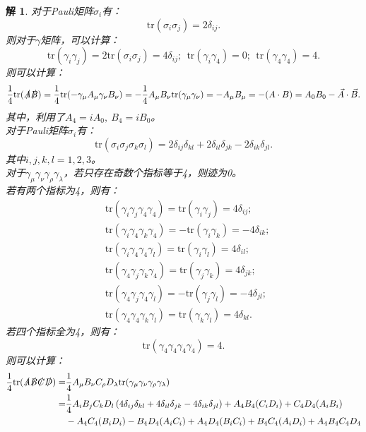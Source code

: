\documentclass[UTF8,10pt,a4paper]{article}
\theoremstyle{Problem}%
\theoremstyle{Solution}%
\newtheorem*{sol}{解}%
\begin{document}
\begin{sol}
对于Pauli矩阵$\sigma_i$有：
\[
    \text{tr}(\sigma_i\sigma_j) = 2\delta_{ij}.
\]
则对于$\gamma$矩阵，可以计算：
\[
    \text{tr}(\gamma_i\gamma_j) = 2\text{tr}(\sigma_i\sigma_j) = 4\delta_{ij}; ~~ \text{tr}(\gamma_i\gamma_4) = 0; ~~ \text{tr}(\gamma_4\gamma_4) = 4.
\]
则可以计算：
\[
    \frac{1}{4}\text{tr}(\slashed{A}\slashed{B}) = \frac{1}{4}\text{tr}(-\gamma_\mu A_\mu \gamma_\nu B_\nu) = -\frac{1}{4} A_\mu B_\nu \text{tr}(\gamma_\mu\gamma_\nu) = -A_\mu B_\mu = -(A\cdot B) = A_0 B_0 - \vec{A} \cdot \vec{B}.
\]
其中，利用了$A_4 = iA_0, ~ B_4 = iB_0$。 \\
对于Pauli矩阵$\sigma_i$有：
\[
    \text{tr}(\sigma_i \sigma_j \sigma_k \sigma_l) = 2\delta_{ij}\delta_{kl} + 2\delta_{il}\delta_{jk} - 2\delta_{ik}\delta_{jl}.
\]
其中$i,j,k,l = 1,2,3$。 \\
对于$\gamma_\mu \gamma_\nu \gamma_\rho \gamma_\lambda$，若只存在奇数个指标等于4，则迹为0。 \\
若有两个指标为4，则有：
\[
    \begin{aligned}
    &\text{tr}(\gamma_i \gamma_j \gamma_4 \gamma_4) = \text{tr}(\gamma_i \gamma_j) = 4\delta_{ij}; \\
    &\text{tr}(\gamma_i \gamma_4 \gamma_k \gamma_4) = -\text{tr}(\gamma_i \gamma_k) = -4\delta_{ik}; \\
    &\text{tr}(\gamma_i \gamma_4 \gamma_4 \gamma_l) = \text{tr}(\gamma_i \gamma_l) = 4\delta_{il}; \\
    &\text{tr}(\gamma_4 \gamma_j \gamma_k \gamma_4) = \text{tr}(\gamma_j\gamma_k) = 4\delta_{jk}; \\
    &\text{tr}(\gamma_4 \gamma_j \gamma_4 \gamma_l) = -\text{tr}(\gamma_j \gamma_l) = -4\delta_{jl}; \\
    &\text{tr}(\gamma_4 \gamma_4 \gamma_k \gamma_l) = \text{tr}(\gamma_k \gamma_l) = 4\delta_{kl}.
    \end{aligned}
\]
若四个指标全为4，则有：
\[
    \text{tr}(\gamma_4 \gamma_4 \gamma_4 \gamma_4) = 4.
\]
则可以计算：
\[
    \begin{aligned}
    \frac{1}{4}\text{tr}(\slashed{A}\slashed{B}\slashed{C}\slashed{D}) =& \frac{1}{4}A_\mu B_{\nu} C_{\rho} D_{\lambda} \text{tr}(\gamma_\mu \gamma_\nu \gamma_\rho \gamma_\lambda) \\
    =& \frac{1}{4} A_i B_j C_k D_l \left( 4\delta_{ij}\delta_{kl} + 4\delta_{il}\delta_{jk} - 4\delta_{ik}\delta_{jl} \right) + A_4B_4(C_i D_i) + C_4D_4(A_iB_i) \\ 
    &- A_4C_4(B_i D_i) - B_4D_4 (A_iC_i) + A_4D_4(B_iC_i) + B_4C_4(A_iD_i) + A_4B_4C_4D_4 \\

\end{aligned}\]
\end{sol}
\end{document}
